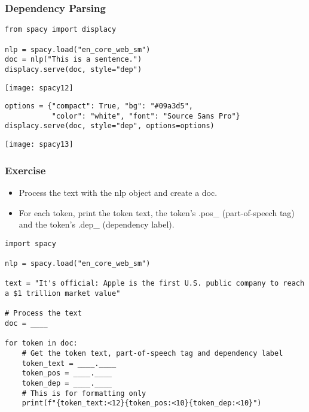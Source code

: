 \begin{frame}[fragile]\frametitle{Dependency Parsing}

\begin{lstlisting}
from spacy import displacy

nlp = spacy.load("en_core_web_sm")
doc = nlp("This is a sentence.")
displacy.serve(doc, style="dep")
\end{lstlisting}

\begin{center}
\texttt{[image: spacy12]}
\end{center}

\begin{lstlisting}
options = {"compact": True, "bg": "#09a3d5",
           "color": "white", "font": "Source Sans Pro"}
displacy.serve(doc, style="dep", options=options)
\end{lstlisting}

\begin{center}
\texttt{[image: spacy13]}
\end{center}

\end{frame}


\begin{frame}[fragile]\frametitle{Exercise}

  \begin{itemize}
    \item Process the text with the nlp object and create a doc.
    \item For each token, print the token text, the token's .pos\_ (part-of-speech tag) and the token's .dep\_ (dependency label).
  \end{itemize}

  \begin{lstlisting}
import spacy

nlp = spacy.load("en_core_web_sm")

text = "It's official: Apple is the first U.S. public company to reach a $1 trillion market value"

# Process the text
doc = ____

for token in doc:
    # Get the token text, part-of-speech tag and dependency label
    token_text = ____.____
    token_pos = ____.____
    token_dep = ____.____
    # This is for formatting only
    print(f"{token_text:<12}{token_pos:<10}{token_dep:<10}")
  \end{lstlisting}
	
\end{frame}